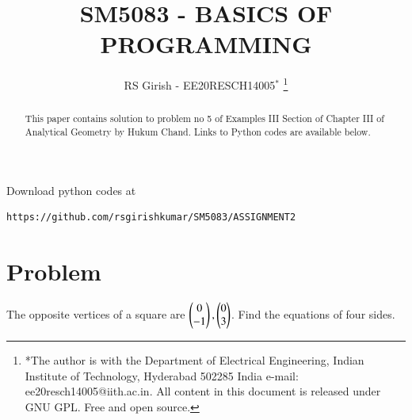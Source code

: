 \documentclass[journal,12pt,twocolumn]{IEEEtran}
\begin{document}
\makeatletter
{}
\makeatother
\let\StandardTheFigure\thefigure
\let\vec\mathbf
\renewcommand{\thefigure}{\theproblem}
\def\putbox#1#2#3{\makebox[0in][l]{\makebox[#1][l]{}\raisebox{\baselineskip}[0in][0in]{\raisebox{#2}[0in][0in]{#3}}}}
     \def\rightbox#1{\makebox[0in][r]{#1}}
     \def\centbox#1{\makebox[0in]{#1}}
     \def\topbox#1{\raisebox{-\baselineskip}[0in][0in]{#1}}
     \def\midbox#1{\raisebox{-0.5\baselineskip}[0in][0in]{#1}}
\vspace{3cm}
\title{
SM5083 - BASICS OF PROGRAMMING
	}
\author{ RS Girish - EE20RESCH14005$^{*}$%
\thanks{*The author is with the Department
		of Electrical Engineering, Indian Institute of Technology, Hyderabad
		502285 India e-mail:  ee20resch14005@iith.ac.in. All content in this document is released under GNU GPL.  Free and open source.}
	}
\maketitle
\newpage
\tableofcontents
\bigskip
\renewcommand{\thefigure}{\theenumi}
\renewcommand{\thetable}{\theenumi}
\begin{abstract}
This paper contains solution to problem no 5 of Examples III Section of Chapter III of Analytical Geometry by Hukum Chand.
Links to Python codes are available below.  
\end{abstract}
Download python codes at 
\begin{lstlisting}
https://github.com/rsgirishkumar/SM5083/ASSIGNMENT2
\end{lstlisting}
\section{Problem}
The opposite vertices of a square are $\begin{pmatrix}0\\-1\end{pmatrix},\begin{pmatrix}0\\3\end{pmatrix}$. Find the equations of four sides.
\end{document}
